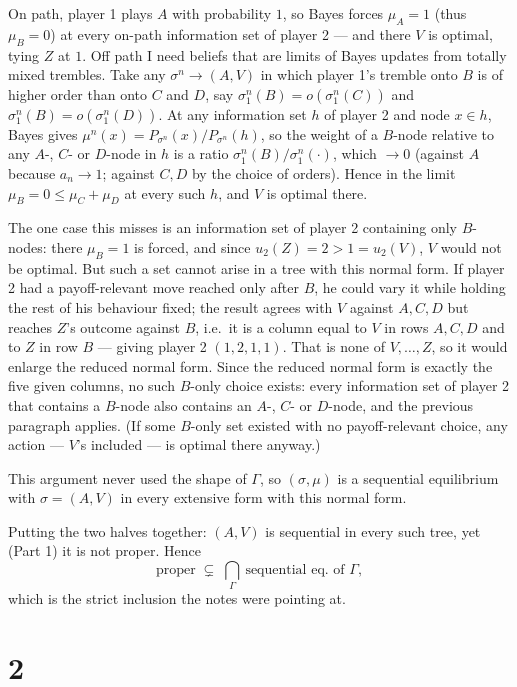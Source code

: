 \documentclass[12pt]{article}
\begin{document}
On path, player 1 plays $A$ with probability $1$, so Bayes forces $\mu_A=1$ (thus
$\mu_B=0$) at every on-path information set of player 2 --- and there $V$ is optimal,
tying $Z$ at $1$. Off path I need beliefs that are limits of Bayes updates from
totally mixed trembles. Take any $\sigma^n\to(A,V)$ in which player 1's tremble onto $B$
is of higher order than onto $C$ and $D$, say $\sigma^n_1(B)=o(\sigma^n_1(C))$ and
$\sigma^n_1(B)=o(\sigma^n_1(D))$. At any information set $h$ of player 2 and node
$x\in h$, Bayes gives $\mu^n(x)=P_{\sigma^n}(x)/P_{\sigma^n}(h)$, so the weight of a
$B$-node relative to any $A$-, $C$- or $D$-node in $h$ is a ratio $\sigma^n_1(B)/\sigma^n_1(\cdot)$, which $\to 0$ (against $A$ because $a_n\to1$; against
$C,D$ by the choice of orders). Hence in the limit $\mu_B=0\le\mu_C+\mu_D$ at every such
$h$, and $V$ is optimal there.

The one case this misses is an information set of player 2 containing only $B$-nodes: there $\mu_B=1$ is forced, and since $u_2(Z)=2>1=u_2(V)$, $V$ would not be optimal. But such a set cannot arise in a tree with this normal form. If player 2 had a payoff-relevant move reached only after $B$, he could vary it while holding the rest of his behaviour fixed; the result agrees with $V$ against $A,C,D$ but reaches $Z$'s outcome against $B$, i.e.\ it is a column equal to $V$ in rows $A,C,D$ and to $Z$ in row $B$ --- giving player 2 $(1,2,1,1)$. That is none of $V,\dots,Z$, so it would enlarge the reduced normal form. Since the reduced normal form is exactly the five given columns, no such $B$-only choice exists: every information set of player 2 that contains a $B$-node also contains an $A$-, $C$- or $D$-node, and the previous paragraph applies. (If some $B$-only set existed with no payoff-relevant choice, any action --- $V$'s included --- is optimal there anyway.)

This argument never used the shape of $\Gamma$, so $(\sigma,\mu)$ is a sequential
equilibrium with $\sigma=(A,V)$ in every extensive form with this normal form.

Putting the two halves together: $(A,V)$ is sequential in every such tree, yet (Part 1)
it is not proper. Hence
\[
\text{proper} \;\subsetneq\; \bigcap_{\Gamma}\ \text{sequential eq.\ of }\Gamma,
\]
which is the strict inclusion the notes were pointing at.

\section*{2}
 
\end{document}
